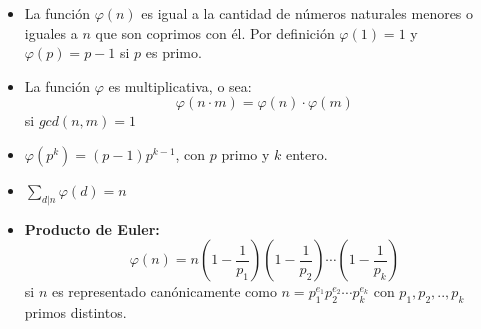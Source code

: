 \begin{itemize}
	\item{ La funci\'on $\varphi(n)$ es igual a la cantidad de n\'umeros naturales menores o iguales a
		$n$ que son coprimos con \'el. Por definici\'on $\varphi( 1 ) = 1$ y $\varphi( p ) = {p} - {1}$ si $p$ es primo.
	}
	\item{ La funci\'on $\varphi$ es multiplicativa, o sea:
		$$ \varphi(n \cdot m) = \varphi(n) \cdot \varphi(m) $$ 
		si $gcd(n, m) = 1$
	}
	\item{ 
		$\varphi(p^k) = (p-1) p ^{k-1}$, con $p$ primo y $k$ entero. 
	}
	\item{ $\sum_{d|n} \varphi(d) = n$
	
	}
	\item{ \textbf{Producto de Euler:}
		$$\varphi(n) = n \left( {1 - \frac{1}{p_1}}\right) \left( {1 - \frac{1}{p_2} }\right) \cdots \left( {1 - \frac{1}{p_k}}\right)$$
		si $n$ es representado can\'onicamente como $n = p^{e_1}_1 p^{e_2}_2 \cdots p^{e_k}_k$ con $p_1, p_2, .., p_k$ primos distintos.  
    }
\end{itemize}

